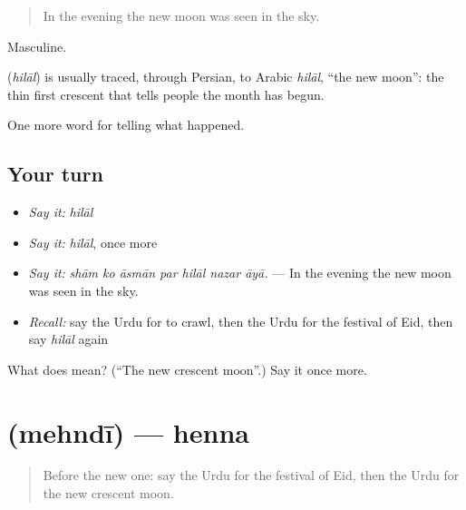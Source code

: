 \begin{quote}
In the evening the new moon was seen in the sky.
\end{quote}

Masculine.

\begin{cousinweb}
\textbf{} (\emph{hilāl}) is usually traced, through Persian, to Arabic \emph{hilāl}, \textquotedblleft{}the new moon\textquotedblright{}: the thin first crescent that tells people the month has begun.
\end{cousinweb}

\begin{grammarlens}[title={What you've built}]
One more word for telling what happened.
\end{grammarlens}

\subsection*{Your turn}
\begin{itemize}
\raggedright
  \item \emph{Say it:} \emph{hilāl}
  \item \emph{Say it:} \emph{hilāl}, once more
  \item \emph{Say it:} \emph{shām ko āsmān par hilāl nazar āyā.} — In the evening the new moon was seen in the sky.
  \item \emph{Recall:} say the Urdu for to crawl, then the Urdu for the festival of Eid, then say \emph{hilāl} again
\end{itemize}

\begin{tcolorbox}[breakable,colback=teal!4,colframe=teal!35!black,title={Before you move on}]
What does  mean? (\textquotedblleft{}The new crescent moon\textquotedblright{}.) Say it once more.
\end{tcolorbox}
\section[\texorpdfstring{\ur{مہندی} (mehndī)}{مہندی (mehndī)}]{ (mehndī) — henna}

\label{lesson:UR-C317-mehndi}



\begin{quote}
Before the new one: say the Urdu for the festival of Eid, then the Urdu for the new crescent moon.
\end{quote}

